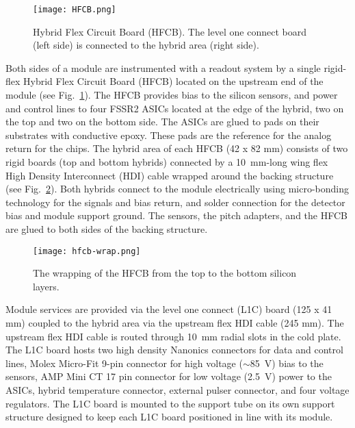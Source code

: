 \begin{figure}[hbt] 
\centering 
\texttt{[image: HFCB.png]}
\caption{Hybrid Flex Circuit Board (HFCB). The level one connect board (left side) is connected to the hybrid area (right side).}
\label{fig:HFCB}
\end{figure}

Both sides of a module are instrumented with a readout system by a single rigid-flex Hybrid Flex Circuit Board (HFCB) located on the upstream end of the module (see Fig.~\ref{fig:HFCB}). The HFCB provides bias to the silicon sensors, and power and control lines to four FSSR2 ASICs located at the edge of the hybrid, two on the top and two on the bottom side. The ASICs are glued to pads on their substrates with conductive epoxy. These pads are the reference for the analog return for the chips. The hybrid area of each HFCB (42 x 82 mm) consists of two rigid boards (top and bottom hybrids) connected by a 10~mm-long wing flex High Density Interconnect (HDI) cable wrapped around the backing structure (see Fig.~\ref{fig:hfcb-wrap}). Both hybrids connect to the module electrically using micro-bonding technology for the signals and bias return, and solder connection for the detector bias and module support ground. The sensors, the pitch adapters, and the HFCB are glued to both sides of the backing structure. 

\begin{figure}[hbt] 
\centering 
\texttt{[image: hfcb-wrap.png]}
\caption{The wrapping of the HFCB from the top to the bottom silicon layers.}
\label{fig:hfcb-wrap}
\end{figure}

Module services are provided via the level one connect (L1C) board (125 x 41 mm) coupled to the hybrid area via the upstream flex HDI cable (245 mm). The upstream flex HDI cable is routed through 10~mm radial slots in the cold plate. The L1C board hosts two high density Nanonics connectors for data and control lines, Molex Micro-Fit 9-pin connector for high voltage ($\sim$85~V) bias to the sensors, AMP Mini CT 17 pin connector for low voltage (2.5~V) power to the ASICs, hybrid temperature connector, external pulser connector, and four voltage regulators. The L1C board is mounted to the support tube on its own support structure designed to keep each L1C board positioned in line with its module.


